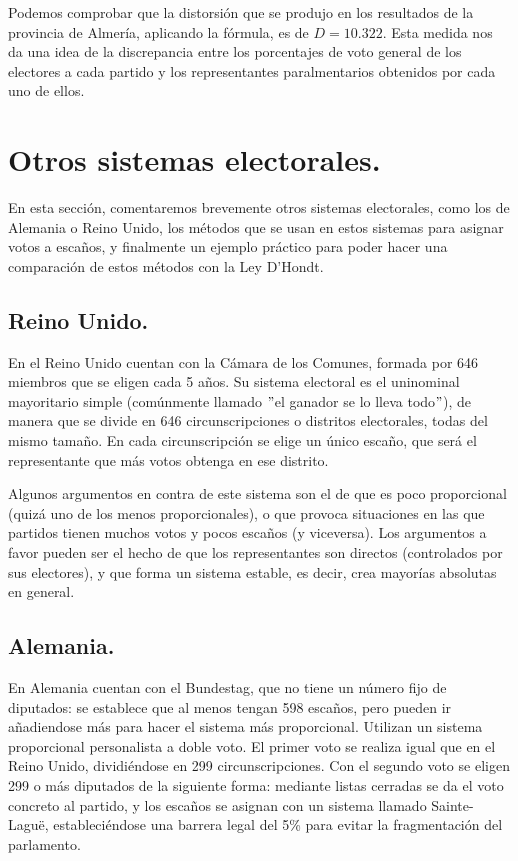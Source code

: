 \documentclass[11pt]{article}
\begin{document}
	 Podemos comprobar que la distorsión que se produjo en los resultados de la provincia de Almería, aplicando la fórmula, es de $D = 10.322$. Esta medida nos da una idea de la discrepancia entre los porcentajes de voto general de los electores a cada partido y los representantes paralmentarios obtenidos por cada uno de ellos.
	 
	 \newpage
	
	\section{Otros sistemas electorales.}
	
	En esta sección, comentaremos brevemente otros sistemas electorales, como los de Alemania o Reino Unido, los métodos que se usan en estos sistemas para asignar votos a escaños, y finalmente un ejemplo práctico para poder hacer una comparación de estos métodos con la Ley D'Hondt.
	
\subsection{Reino Unido.}

En el Reino Unido cuentan con la Cámara de los Comunes, formada por 646 miembros que se eligen cada 5 años. Su sistema electoral es el uninominal mayoritario simple (comúnmente llamado $"$el ganador se lo lleva todo$"$), de manera que se divide en 646 circunscripciones o distritos electorales, todas del mismo tamaño. En cada circunscripción se elige un único escaño, que será el representante que más votos obtenga en ese distrito.

Algunos argumentos en contra de este sistema son el de que es poco proporcional (quizá uno de los menos proporcionales), o que provoca situaciones en las que partidos tienen muchos votos y pocos escaños (y viceversa). Los argumentos a favor pueden ser el hecho de que los representantes son directos (controlados por sus electores), y que forma un sistema estable, es decir, crea mayorías absolutas en general.

\subsection{Alemania.}

En Alemania cuentan con el Bundestag, que no tiene un número fijo de diputados: se establece que al menos tengan 598 escaños, pero pueden ir añadiendose más para hacer el sistema más proporcional. Utilizan un sistema proporcional personalista a doble voto. El primer voto se realiza igual que en el Reino Unido, dividiéndose en 299 circunscripciones. Con el segundo voto se eligen 299 o más diputados de la siguiente forma: mediante listas cerradas se da el voto concreto al partido, y los escaños se asignan con un sistema llamado Sainte-Laguë, estableciéndose una barrera legal del 5\% para evitar la fragmentación del parlamento.
\end{document}
